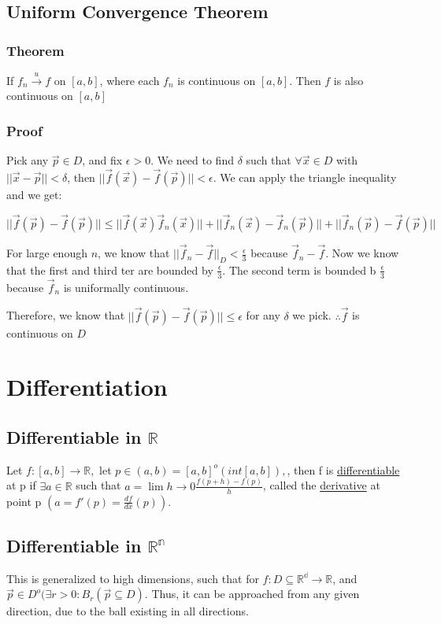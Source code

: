 \documentclass[11 pt, twoside]{article}
\begin{document}
\subsection{Uniform Convergence Theorem}
\subsubsection{Theorem}
If $f_n \overset{u}{\to} f$ on $[a, b]$, where each $f_n$ is continuous on
$[a,b]$. Then $f$ is also continuous on $[a,b]$

\subsubsection{Proof}
Pick any $\vec{p} \in D$, and fix $\epsilon > 0$. We need to find $\delta$
such that $\forall \vec{x} \in D$ with $||\vec{x} - \vec{p}|| < \delta$,
then $||\vec{f}(\vec{x}) - \vec{f}(\vec{p})|| < \epsilon$. 
We can apply the triangle inequality and we get:

$$||\vec{f}(\vec{p}) - \vec{f}(\vec{p})|| \leq ||\vec{f}(\vec{x}) 
\vec{f}_n(\vec{x})|| + ||\vec{f}_n(\vec{x}) - \vec{f}_n(\vec{p})|| +
||\vec{f}_n(\vec{p}) - \vec{f}(\vec{p})||$$

For large enough $n$, we know that $||\vec{f}_n - \vec{f}||_D < \frac{\epsilon}{3}$
because $\vec{f}_n - \vec{f}$. Now we know that the first and third ter
are bounded by $\frac{\epsilon}{3}$. The second term is bounded b
$\frac{\epsilon}{3}$ because $\vec{f}_n$ is uniformally continuous.

Therefore, we know that $||\vec{f}(\vec{p}) - \vec{f}(\vec{p})|| \le
\epsilon$ for any $\delta$ we pick. $\therefore \vec{f}$ is continuous on $D$

\section{Differentiation}

\subsection{Differentiable in $\mathbb{R}$}
Let $f: [a, b] \to \mathbb{R},$ let $p \in (a, b) = [a, b]^o (int [a, b]),$, then f is \underline{differentiable} at p if $ \exists a \in \mathbb{R}$ such that $a = \lim{h \to 0} \frac{f(p+h) - f(p)}{h}$, called the \underline{derivative} at point p $(a = f'(p) = \frac{df}{dx}(p)).$

\subsection{Differentiable in $\mathbb{R^n}$}
This is generalized to high dimensions, such that for $f: D \subseteq \mathbb{R^d} \to \mathbb{R}$, and $\vec{p} \in D^o (\exists r > 0: B_r(\vec{p} \subseteq D)$. Thus, it can be approached from any given direction, due to the ball existing in all directions.
\end{document}
